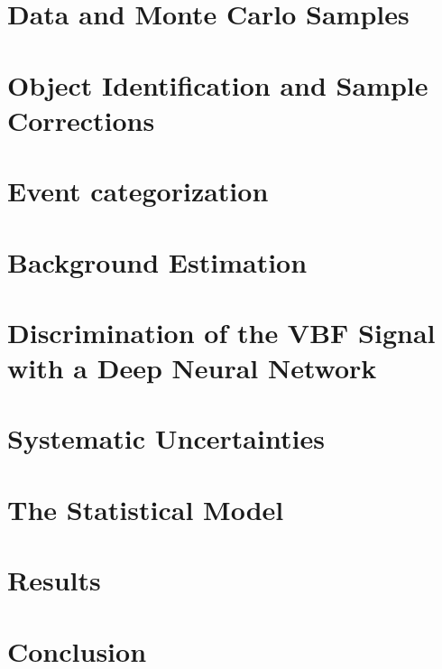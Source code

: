 \section{Data and Monte Carlo Samples}
\label{sec:data-mc-samples}



\section{Object Identification and Sample Corrections}
\label{sec:object-selection}



\section{Event categorization}
\label{sec:event-categorization}



\section{Background Estimation}
\label{sec:bkg-estimation}


\section{Discrimination of the VBF Signal with a Deep Neural Network}
\label{sec:dnn}



\section{Systematic Uncertainties}
\label{sec:systematics}



\section{The Statistical Model}
\label{sec:stats-analysis}



\section{Results}
\label{sec:hww-results}


\section{Conclusion}
\label{sec:conclusion}
